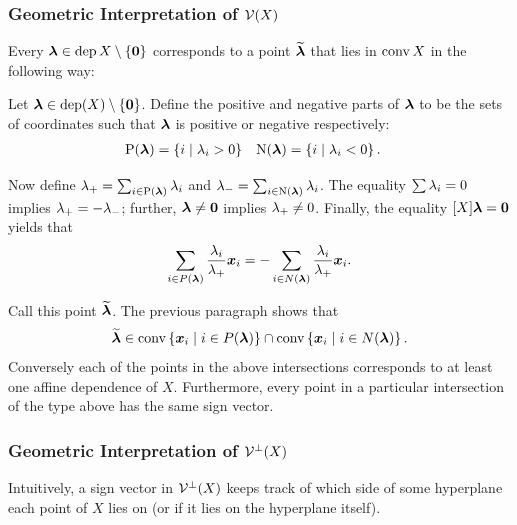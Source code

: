             \subsubsection{Geometric Interpretation of \protect$\mathcal{V}(X)\protect$}
                Every \(\bm{\lambda}\in\operatorname{dep} X\setminus\{\bm{0}\}\) corresponds to a point \(\widetilde{\bm{\lambda}}\) that lies in \(\operatorname{conv} X\) in the following way:

                Let \(\bm{\lambda}\in\operatorname{dep}(X)\setminus\{\bm{0}\}\).  Define the positive and negative parts of \(\bm{\lambda}\) to be the sets of coordinates such that \(\bm{\lambda}\) is positive or negative respectively:
                \begin{align*}
                    \Pos{\ve\la}
                        &=  \setb{i}{\la_i>0}&
                    \Neg{\ve\la}
                        &=  \setb{i}{\la_i<0}.
                \end{align*}

                Now define \(\lambda_+=\sum_{i\in\operatorname{P}(\bm{\lambda})}\lambda_i\) and \(\lambda_-=\sum_{i\in\operatorname{N}(\bm{\lambda})}\lambda_i\).  The equality \(\sum\lambda_i=0\) implies \(\lambda_+=-\lambda_-\); further, \(\bm{\lambda}\neq\bm{0}\) implies \(\lambda_+\neq0\).  Finally, the equality \([X]\bm{\lambda}=\bm{0}\) yields that
                \begin{align*}
                    \sum_{i\in P(\bm{\lambda})}\frac{\lambda_i}{\lambda_+}\bm{x}_i
                        =   -\sum_{i\in N(\bm{\lambda})}\frac{\lambda_i}{\lambda_+}\bm{x}_i.
                \end{align*}

                Call this point \(\widetilde{\bm{\lambda}}\).  The previous paragraph shows that
                \[
                    \wt{\ve\la}
                        \in     \conv\setb{\ve x_i}{i\in P(\ve\la)}
                                    \cap    \conv\setb{\ve x_i}{i\in N(\ve\la)}.
                \]
                Conversely each of the points in the above intersections corresponds to at least one affine dependence of \(X\).  Furthermore, every point in a particular intersection of the type above has the same sign vector.
            \subsubsection{Geometric Interpretation of \protect$\mathcal{V}^\perp(X)\protect$}
                Intuitively, a sign vector in \(\mathcal{V}^\perp(X)\) keeps track of which side of some hyperplane each point of \(X\) lies on (or if it lies on the hyperplane itself).

